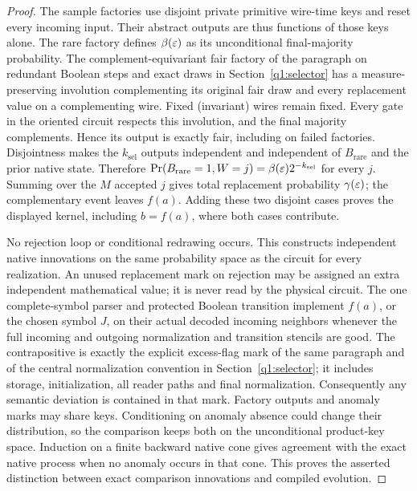 \begin{proof}
The sample factories use disjoint private primitive wire-time keys and reset every incoming input. Their abstract outputs are thus functions of those keys alone. The rare factory defines \(\beta(\varepsilon)\) as its unconditional final-majority probability. The complement-equivariant fair factory of the paragraph on redundant Boolean steps and exact draws in Section~\ref{q1:selector} has a measure-preserving involution complementing its original fair draw and every replacement value on a complementing wire. Fixed (invariant) wires remain fixed. Every gate in the oriented circuit respects this involution, and the final majority complements. Hence its output is exactly fair, including on failed factories. Disjointness makes the \(k_{\mathrm{sel}}\) outputs independent and independent of \(B_{\mathrm{rare}}\) and the prior native state. Therefore \(\operatorname{Pr}(B_{\mathrm{rare}}=1,W=j)=\beta(\varepsilon)2^{-k_{\mathrm{sel}}}\) for every \(j\). Summing over the \(M\) accepted \(j\) gives total replacement probability \(\gamma(\varepsilon)\); the complementary event leaves \(f(a)\). Adding these two disjoint cases proves the displayed kernel, including \(b=f(a)\), where both cases contribute.

No rejection loop or conditional redrawing occurs. This constructs independent native innovations on the same probability space as the circuit for every realization. An unused replacement mark on rejection may be assigned an extra independent mathematical value; it is never read by the physical circuit. The one complete-symbol parser and protected Boolean transition implement \(f(a)\), or the chosen symbol \(J\), on their actual decoded incoming neighbors whenever the full incoming and outgoing normalization and transition stencils are good. The contrapositive is exactly the explicit excess-flag mark of the same paragraph and of the central normalization convention in Section~\ref{q1:selector}; it includes storage, initialization, all reader paths and final normalization. Consequently any semantic deviation is contained in that mark. Factory outputs and anomaly marks may share keys. Conditioning on anomaly absence could change their distribution, so the comparison keeps both on the unconditional product-key space. Induction on a finite backward native cone gives agreement with the exact native process when no anomaly occurs in that cone. This proves the asserted distinction between exact comparison innovations and compiled evolution. 
\end{proof}
